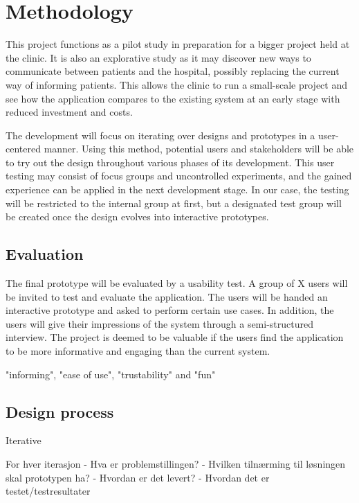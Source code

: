 \chapter{Methodology}
\label{ch:methodology}

This project functions as a pilot study in preparation for a bigger project held at the clinic. It is also an explorative study as it may discover new ways to communicate between patients and the hospital, possibly replacing the current way of informing patients. This allows the clinic to run a small-scale project and see how the application compares to the existing system at an early stage with reduced investment and costs.

The development will focus on iterating over designs and prototypes in a user-centered manner. Using this method, potential users and stakeholders will be able to try out the design throughout various phases of its development. This user testing may consist of focus groups and uncontrolled experiments, and the gained experience can be applied in the next development stage. In our case, the testing will be restricted to the internal group at first, but a designated test group will be created once the design evolves into interactive prototypes.

\section{Evaluation}
\label{sec:evaluation}

The final prototype will be evaluated by a usability test. A group of X users will be invited to test and evaluate the application. The users will be handed an interactive prototype and asked to perform certain use cases. In addition, the users will give their impressions of the system through a semi-structured interview. The project is deemed to be valuable if the users find the application to be more informative and engaging than the current system.

"informing", "ease of use", "trustability" and "fun"

\section{Design process}
\label{sec:designprocess}

Iterative

For hver iterasjon
- Hva er problemstillingen?
- Hvilken tilnærming til løsningen skal prototypen ha?
- Hvordan er det levert?
- Hvordan det er testet/testresultater

